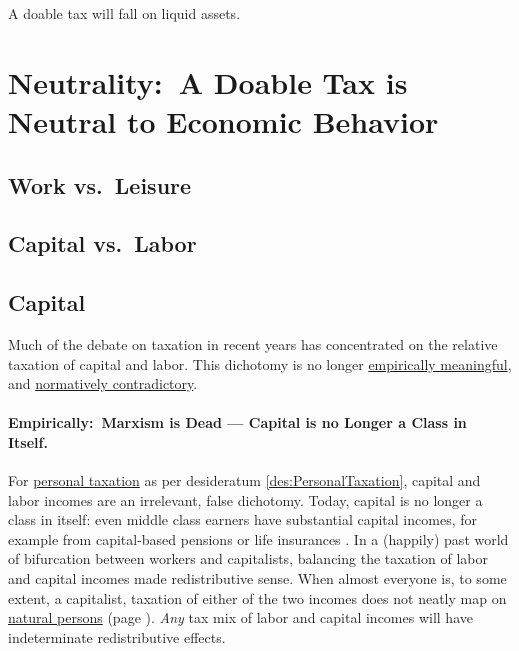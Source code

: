 \begin{desideratum}
	\label{des:NoIlliquidAssets}
	A doable tax will fall on liquid assets.
\end{desideratum}

\section[Neutrality]{Neutrality:~A Doable Tax is Neutral to Economic Behavior}
	\label{sec:tax-neutrality}

\subsection{Work vs.\ Leisure}



\subsection{Capital vs.\ Labor} %

\subsection{Capital}
Much of the debate on taxation in recent years has concentrated on the relative taxation of capital and labor.
This dichotomy is no longer \href{sec:CapitalNoClass}{empirically meaningful}, and \href{sec:TwoSavingsNorms}{normatively contradictory}.

\paragraph{Empirically:~Marxism is Dead --- Capital is no Longer a Class in Itself.}
	\label{sec:CapitalNoClass}
For \href{des:PersonalTaxation}{personal taxation} as per desideratum \ref{des:PersonalTaxation}, capital and labor incomes are an irrelevant, false dichotomy.
Today, capital is no longer a class in itself:
even middle class earners have substantial capital incomes, for example from capital-based pensions or life insurances \citep[XV]{Grabka2007a}.
In a (happily) past world of bifurcation between workers and capitalists, balancing the taxation of labor and capital incomes made redistributive sense.
When almost everyone is, to some extent, a capitalist, taxation of either of the two incomes does not neatly map on \hyperref[des:PersonalTaxation]{natural persons} (page \pageref{des:PersonalTaxation}).
\emph{Any} tax mix of labor and capital incomes will have indeterminate redistributive effects.


